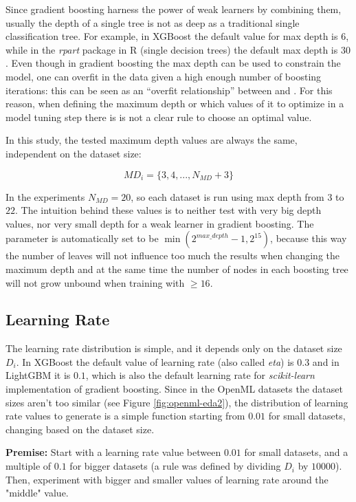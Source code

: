 Since gradient boosting harness the power of weak learners by combining them, usually the depth of a single tree is not as deep as a traditional single classification tree. For example, in XGBoost the default value for max depth is $6$, while in the \textit{rpart} package in R (single decision trees) the default max depth is $30$. Even though in gradient boosting the max depth can be used to constrain the model, one can overfit in the data given a high enough number of boosting iterations: this can be seen as an ``overfit relationship'' between  and . For this reason, when defining the maximum depth or which values of it to optimize in a model tuning step there is is not a clear rule to choose an optimal value. 

In this study, the tested maximum depth values are always the same, independent on the dataset size:

$$MD_i = \{3, 4, ..., N_{MD} + 3\}$$

In the experiments $N_{MD} = 20$, so each dataset is run using max depth from $3$ to $22$. The intuition behind these values is to neither test with very big depth values, nor very small depth for a weak learner in gradient boosting. The  parameter is automatically set to be $\min(2^{max\_depth} - 1, 2^{15})$, because this way the number of leaves will not influence too much the results when changing the maximum depth and at the same time the number of nodes in each boosting tree will not grow unbound when training with  $\geq 16$.

\subsection{Learning Rate}

The learning rate distribution is simple, and it depends only on the dataset size $D_i$. In XGBoost the default value of learning rate (also called \textit{eta}) is $0.3$ and in LightGBM it is $0.1$, which is also the default learning rate for \textit{scikit-learn} implementation of gradient boosting. Since in the OpenML datasets the dataset sizes aren't too similar (see Figure \ref{fig:openml-eda2}), the distribution of learning rate values to generate is a simple function starting from $0.01$ for small datasets, changing based on the dataset size.

\textbf{Premise:} Start with a learning rate value between $0.01$ for small datasets, and a multiple of $0.1$ for bigger datasets (a rule was defined by dividing $D_i$ by $10000$). Then, experiment with bigger and smaller values of learning rate around the "middle" value.

